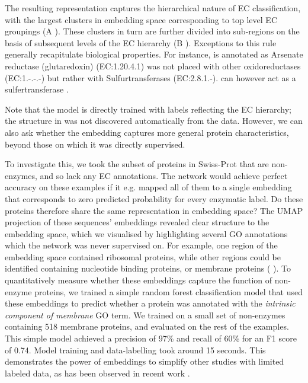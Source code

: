 The resulting representation captures the hierarchical nature of EC classification, with the largest clusters in embedding space corresponding to top level EC groupings (A%
). These clusters in turn are further divided into sub-regions on the basis of subsequent levels of the EC hierarchy (B%
). Exceptions to this rule generally recapitulate biological properties. For instance, \DIFdelbegin {}\DIFdelend \DIFaddbegin \emph{} \DIFaddend is annotated as Arsenate reductase (glutaredoxin) (EC:1.20.4.1) \cite{pmid25464340} was not placed with other oxidoreductases (EC:1.-.-.-) but rather with Sulfurtransferases (EC:2.8.1.-). \DIFdelbegin {}\DIFdelend \DIFaddbegin \emph{} \DIFaddend can however act as a sulfertransferase \cite{pmid17408957}. 


Note that the model is directly trained with labels reflecting the EC hierarchy; the structure in  %
 was not discovered automatically from the data. However, we can also ask whether the embedding captures more general protein characteristics, beyond those on which it was directly supervised.

To investigate this, we took the subset of proteins in Swiss-Prot that are non-enzymes, and so lack any EC annotations. The network would achieve perfect accuracy on these examples if it e.g. mapped all of them to a single embedding that corresponds to zero predicted probability for every enzymatic label. Do these proteins therefore share the same representation in embedding space? The UMAP projection of these sequences' embeddings revealed clear structure to the embedding space, which we visualised by highlighting several GO annotations which the network was never supervised on. For example, one region of the embedding space contained ribosomal proteins, while other regions could be identified containing nucleotide binding proteins, or membrane proteins (%
).
To quantitatively measure whether these embeddings capture the function of non-enzyme proteins, we trained a simple random forest classification model that used these embeddings to predict whether a protein was annotated with the \textit{intrinsic component of membrane} GO term. We trained on a small set of non-enzymes containing 518 membrane proteins, and evaluated on the rest of the examples. This simple model achieved a precision of 97\% and recall of 60\% for an F1 score of 0.74. Model training and data-labelling took around 15 seconds. This demonstrates the power of embeddings to simplify other studies with limited labeled data, as has been observed in recent work \citep{Alley589333,biswas2020low}.

